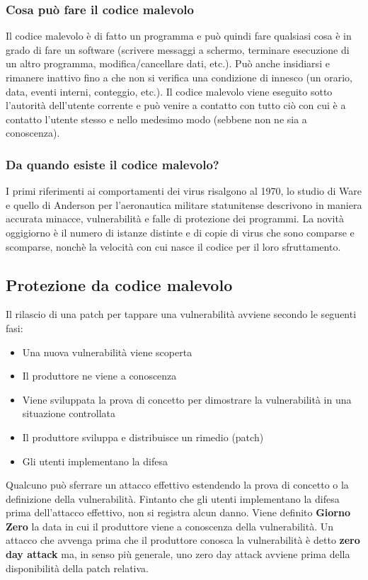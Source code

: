 \subsubsection{Cosa può fare il codice malevolo}
Il codice malevolo è di fatto un programma e può quindi fare qualsiasi cosa è in grado di fare un software (scrivere messaggi a schermo, terminare esecuzione di un altro programma, modifica/cancellare dati, etc.).
Può anche insidiarsi e rimanere inattivo fino a che non si verifica una condizione di innesco (un orario, data, eventi interni, conteggio, etc.).
Il codice malevolo viene eseguito sotto l'autorità dell'utente corrente e può venire a contatto con tutto ciò con cui è a contatto l'utente stesso e nello medesimo modo (sebbene non ne sia a conoscenza).
\subsubsection{Da quando esiste il codice malevolo?}
I primi riferimenti ai comportamenti dei virus risalgono al 1970, lo studio di Ware e quello di Anderson per l'aeronautica militare statunitense descrivono in maniera accurata minacce, vulnerabilità e falle di protezione dei programmi.
La novità oggigiorno è il numero di istanze distinte e di copie di virus che sono comparse e scomparse, nonchè la velocità con cui nasce il codice per il loro sfruttamento.

\subsection{Protezione da codice malevolo}
Il rilascio di una patch per tappare una vulnerabilità avviene secondo le seguenti fasi:
\begin{itemize}
\item Una nuova vulnerabilità viene scoperta
\item Il produttore ne viene a conoscenza
\item Viene sviluppata la prova di concetto per dimostrare la vulnerabilità in una situazione controllata
\item Il produttore sviluppa e distribuisce un rimedio (patch)
\item Gli utenti implementano la difesa
\end{itemize}
Qualcuno può sferrare un attacco effettivo estendendo la prova di concetto o la definizione della vulnerabilità. Fintanto che gli utenti implementano la difesa prima dell'attacco effettivo, non si registra alcun danno.
Viene definito \textbf{Giorno Zero} la data in cui il produttore viene a conoscenza della vulnerabilità.
Un attacco che avvenga prima che il produttore conosca la vulnerabilità è detto \textbf{zero day attack} ma, in senso più generale, uno zero day attack avviene prima della disponibilità della patch relativa.

